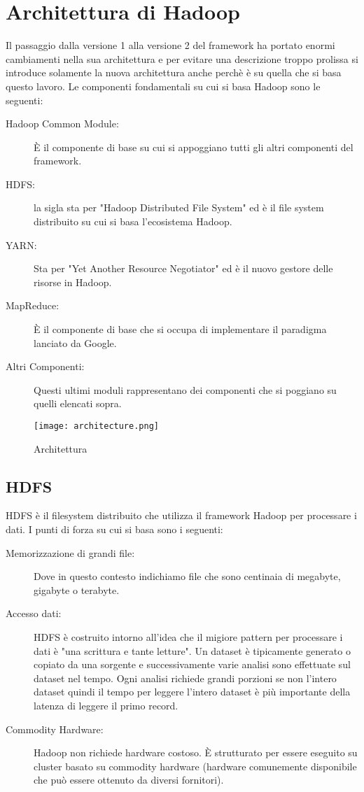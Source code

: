 \section{Architettura di Hadoop}
Il passaggio dalla versione 1 alla versione 2 del framework ha portato enormi cambiamenti nella sua architettura e per evitare una descrizione troppo prolissa si introduce solamente la nuova architettura anche perchè è su quella che si basa questo lavoro. Le componenti fondamentali su cui si basa Hadoop sono le seguenti:
\begin{description}
  \item[Hadoop Common Module:] È il componente di base su cui si appoggiano tutti gli altri componenti del framework.
  \item[HDFS:] la sigla sta per "Hadoop Distributed File System" ed è il file system distribuito su cui si basa l'ecosistema Hadoop.
  \item[YARN:] Sta per "Yet Another Resource Negotiator" ed è il nuovo gestore delle risorse in Hadoop.
  \item[MapReduce:] È il componente di base che si occupa di implementare il paradigma lanciato da Google.
  \item[Altri Componenti:] Questi ultimi moduli rappresentano dei componenti che si poggiano su quelli elencati sopra.
\end{description}
\begin{figure}
  \begin{center}
    \texttt{[image: architecture.png]}
    \caption{Architettura}
    \label{fig:architecture}
  \end{center}
\end{figure}
\subsection{HDFS}
HDFS è il filesystem distribuito che utilizza il framework Hadoop per processare i dati. I punti di forza su cui si basa sono i seguenti:
\begin{description}
  \item[Memorizzazione di grandi file:] Dove in questo contesto indichiamo file che sono centinaia di megabyte, gigabyte o terabyte.
  \item[Accesso dati:] HDFS è costruito intorno all'idea che il migiore pattern per processare i dati è "una scrittura e tante letture". Un dataset è tipicamente generato o copiato da una sorgente e successivamente varie analisi sono effettuate sul dataset nel tempo. Ogni analisi richiede grandi porzioni se non l'intero dataset quindi il tempo per leggere l'intero dataset è più importante della latenza di leggere il primo record.
  \item[Commodity Hardware:]Hadoop non richiede hardware costoso. È strutturato per essere eseguito su cluster basato su commodity hardware (hardware comunemente disponibile che può essere ottenuto da diversi fornitori).
\end{description}
